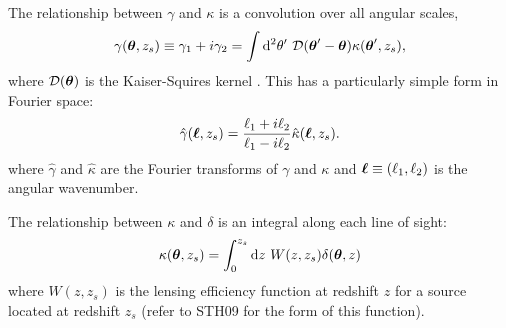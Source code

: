 The relationship between $\gamma$ and $\kappa$ is a convolution over
all angular scales,
\begin{equation}
  \label{gamma_integral}
  \gamma(\myvec\theta,z_s) \equiv \gamma_1 + i\gamma_2 = \int \dd^2\theta^\prime
  \ \mathcal{D}(\myvec\theta^\prime-\myvec\theta)\kappa(\myvec\theta^\prime,z_s),
\end{equation}
where $\mathcal{D}(\boldsymbol{\theta})$ 
is the Kaiser-Squires kernel \citep{Kaiser93}.  
This has a particularly simple form in Fourier space:
\begin{equation}
  \label{gamma_fourier}
  \hat\gamma(\boldsymbol{\ell},z_s) 
  = \frac{\ell_1 + i\ell_2}{\ell_1 - i\ell_2}\hat\kappa(\boldsymbol{\ell},z_s).
\end{equation}
where $\hat\gamma$ and $\hat\kappa$ are the Fourier transforms of $\gamma$
and $\kappa$ and $\boldsymbol{\ell}\equiv(\ell_1,\ell_2)$ is the angular wavenumber.

The relationship between $\kappa$ and $\delta$ is an integral along each
line of sight:
\begin{equation}
  \label{kappa_integral}
  \kappa(\boldsymbol{\theta},z_s) = 
  \int_0^{z_s}\mathrm{d} z\ W(z,z_s)\delta(\boldsymbol{\theta},z)
\end{equation}
where $W(z,z_s)$ is the lensing efficiency function at redshift $z$ 
for a source located at redshift $z_s$ 
(refer to STH09 for the form of this function).

